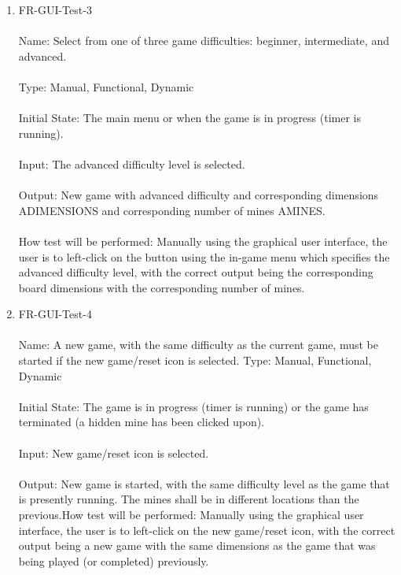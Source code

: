 \documentclass[12pt, titlepage]{article}
\begin{document}
\begin{enumerate}
\item{FR-GUI-Test-3\\\\}
Name: Select from one of three game difficulties: beginner, intermediate, and advanced.\\\\
Type: Manual, Functional, Dynamic\\\\
Initial State: The main menu or when the game is in progress (timer is running).\\\\
Input: The advanced difficulty level is selected.\\\\
Output: New game with advanced difficulty and corresponding dimensions ADIMENSIONS and corresponding number of mines AMINES.\\\\
How test will be performed: Manually using the graphical user interface, the user is to left-click on the button using the in-game menu which specifies the advanced difficulty level, with the correct output being the corresponding board dimensions with the corresponding number of mines.\\

\newpage
\item{FR-GUI-Test-4\\\\}
Name: A new game, with the same difficulty as the current game, must be started if the new game/reset icon is selected.
Type: Manual, Functional, Dynamic\\\\
Initial State: The game is in progress (timer is running) or the game has terminated (a hidden mine has been clicked upon).\\\\
Input: New game/reset icon is selected.\\\\
Output: New game is started, with the same difficulty level as the game that is presently running. The mines shall be in different locations than the previous.How test will be performed: Manually using the graphical user interface, the user is to left-click on the new game/reset icon, with the correct output being a new game with the same dimensions as the game that was being played (or completed) previously.\\


\end{enumerate}
\end{document}
